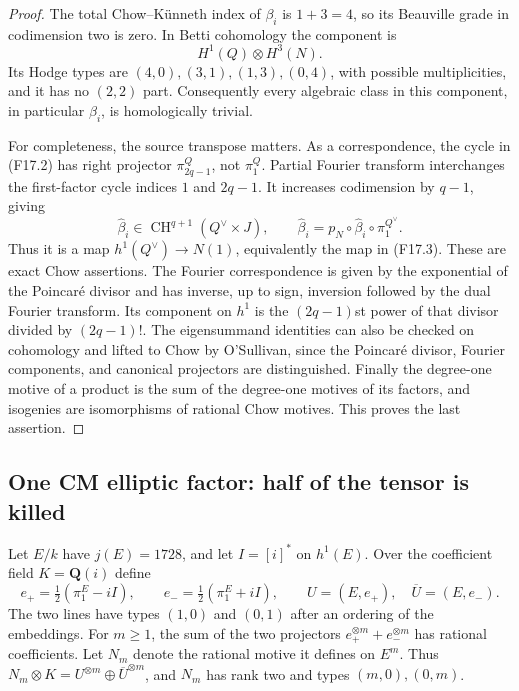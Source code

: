 \documentclass[11pt]{article}
\theoremstyle{remark}\newtheorem{remark}[theorem]{Remark}
\begin{document}
\begin{proof}
The total Chow--K\"unneth index of $\beta_i$ is $1+3=4$,
so its Beauville grade in codimension two is zero.  In Betti
cohomology the component is
\[
                  H^1(Q)\otimes H^3(N).
 \tag{F17.6}
\]
Its Hodge types are $(4,0),(3,1),(1,3),(0,4)$, with possible
multiplicities, and it has no $(2,2)$ part.  Consequently every
algebraic class in this component, in particular $\beta_i$,
is homologically trivial.

For completeness, the source transpose matters.  As a
correspondence, the cycle in (F17.2) has right projector
$\pi_{2q-1}^Q$, not $\pi_1^Q$.  Partial Fourier transform
interchanges the first-factor cycle indices $1$ and $2q-1$.
It increases codimension by $q-1$, giving
\[
 \widehat\beta_i\in\operatorname{CH}^{q+1}(Q^\vee\times J),
 \qquad
 \widehat\beta_i=p_N\circ\widehat\beta_i\circ\pi_1^{Q^\vee}.
 \tag{F17.7}
\]
Thus it is a map $h^1(Q^\vee)\to N(1)$, equivalently the map
in (F17.3).  These are exact Chow assertions.  The Fourier
correspondence is given by the exponential of the Poincar\'e
divisor and has inverse, up to sign, inversion followed by the
dual Fourier transform.  Its component on $h^1$ is the
$(2q-1)$st power of that divisor divided by $(2q-1)!$.
The eigensummand identities can also be checked on cohomology
and lifted to Chow by O'Sullivan, since the Poincar\'e divisor,
Fourier components, and canonical projectors are distinguished.
Finally the degree-one motive of a product is the sum of the
degree-one motives of its factors, and isogenies are isomorphisms
of rational Chow motives.  This proves the last assertion.
\end{proof}

\subsection{One CM elliptic factor: half of the tensor is killed}

Let $E/k$ have $j(E)=1728$, and let $I=[i]^*$ on $h^1(E)$.
Over the coefficient field $K=\mathbf Q(i)$ define
\[
 e_+=\tfrac12(\pi_1^E-iI),\qquad
 e_-=\tfrac12(\pi_1^E+iI),\qquad
 U=(E,e_+),\quad\overline U=(E,e_-).
 \tag{F18.1}
\]
The two lines have types $(1,0)$ and $(0,1)$ after an ordering
of the embeddings.  For $m\ge1$, the sum of the two projectors
$e_+^{\otimes m}+e_-^{\otimes m}$ has rational coefficients.
Let $N_m$ denote the rational motive it defines on $E^m$.
Thus $N_m\otimes K=U^{\otimes m}\oplus\overline U^{\otimes m}$,
and $N_m$ has rank two and types $(m,0),(0,m)$.
\end{document}
